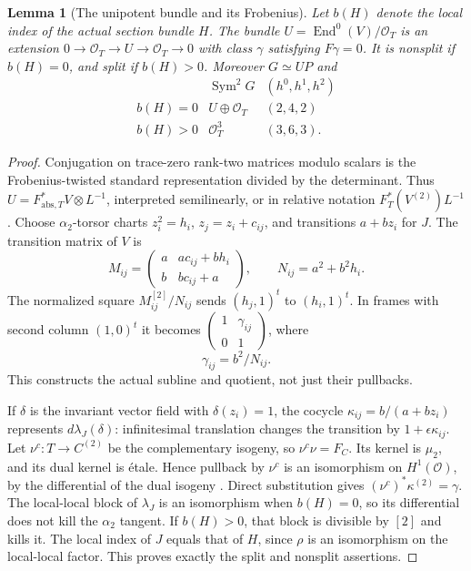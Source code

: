 \documentclass[11pt]{article}
\newtheorem{lemma}[theorem]{Lemma}
\theoremstyle{definition}\newtheorem{definition}[theorem]{Definition}
\theoremstyle{remark}\newtheorem{remark}[theorem]{Remark}
\newcommand{\OO}{\mathcal O}
\begin{document}
\begin{lemma}[The unipotent bundle and its Frobenius]\label{lem:unipotent}
Let $b(H)$ denote the local index of the actual section bundle $H$. The bundle
$U=\operatorname{End}^0(V)/\OO_T$ is an extension
$0\to\OO_T\to U\to\OO_T\to0$ with class $\gamma$ satisfying $F\gamma=0$.
It is nonsplit if $b(H)=0$, and split if $b(H)>0$.
Moreover $G\simeq UP$ and
\[
 \begin{array}{c|c|c}
 &\operatorname{Sym}^2G&(h^0,h^1,h^2)\\ \hline
 b(H)=0&U\oplus\OO_T&(2,4,2)\\
 b(H)>0&\OO_T^3&(3,6,3).
 \end{array}                                               \tag{P9}
\]
\end{lemma}
\begin{proof}
Conjugation on trace-zero rank-two matrices modulo scalars is the Frobenius-twisted standard representation divided by the determinant. Thus $U=F_{\mathrm{abs},T}^*V\otimes L^{-1}$, interpreted semilinearly, or in relative notation $F_T^*(V^{(2)})L^{-1}$.
Choose $\alpha _2$-torsor charts $z_i^2=h_i$, $z_j=z_i+c_{ij}$, and transitions $a+bz_i$ for $J$. The transition matrix of $V$ is
\[
 M_{ij}=\begin{pmatrix}a&ac_{ij}+bh_i\\b&bc_{ij}+a\end{pmatrix},
 \qquad N_{ij}=a^2+b^2h_i.
\]
The normalized square $M_{ij}^{[2]}/N_{ij}$ sends $(h_j,1)^t$ to $(h_i,1)^t$. In frames with second column $(1,0)^t$ it becomes
$\left(\begin{smallmatrix}1&\gamma_{ij}\\0&1\end{smallmatrix}\right)$, where
\[
                         \gamma_{ij}=b^2/N_{ij}.           \tag{P10}
\]
This constructs the actual subline and quotient, not just their pullbacks.

If $\delta$ is the invariant vector field with $\delta(z_i)=1$, the cocycle
$\kappa_{ij}=b/(a+bz_i)$ represents $d\lambda_J(\delta)$: infinitesimal translation changes the transition by $1+\epsilon\kappa_{ij}$. Let $\nu^c:T\to C^{(2)}$ be the complementary isogeny, so $\nu^c\nu=F_C$. Its kernel is $\mu _2$, and its dual kernel is \'etale. Hence pullback by $\nu^c$ is an isomorphism on $H^1(\OO)$, by the differential of the dual isogeny \citep[Theorem~7.5 and proof, p.~100]{EGM}. Direct substitution gives
$(\nu^c)^*\kappa^{(2)}=\gamma$.
The local-local block of $\lambda_J$ is an isomorphism when $b(H)=0$, so its differential does not kill the $\alpha _2$ tangent. If $b(H)>0$, that block is divisible by $[2]$ and kills it. The local index of $J$ equals that of $H$, since $\rho$ is an isomorphism on the local-local factor. This proves exactly the split and nonsplit assertions.


\end{proof}
\end{document}

